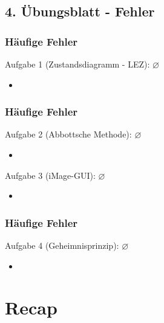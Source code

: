 \documentclass[18pt]{beamer}
\begin{document}
	\subsection{4. Übungsblatt - Fehler}
	\begin{frame}
		\frametitle{Häufige Fehler}
		\begin{block}{Aufgabe 1 (Zustandsdiagramm - LEZ): $\diameter$}%
			\begin{itemize}
				\item %
			\end{itemize}
		\end{block}
	\end{frame}

	\begin{frame}
		\frametitle{Häufige Fehler}
		\begin{block}{Aufgabe 2 (Abbottsche Methode): $\diameter$}%
			\begin{itemize}
				\item %
			\end{itemize}
		\end{block}
		\begin{block}{Aufgabe 3 (iMage-GUI): $\diameter$}%
			\begin{itemize}
				\item	%
			\end{itemize}
		\end{block}
	\end{frame}

	\begin{frame}
		\frametitle{Häufige Fehler}
		\begin{block}{Aufgabe 4 (Geheimnisprinzip): $\diameter$}%
			\begin{itemize}
				\item %
			\end{itemize}
		\end{block}
	\end{frame}

\section{Recap}
\end{document}
